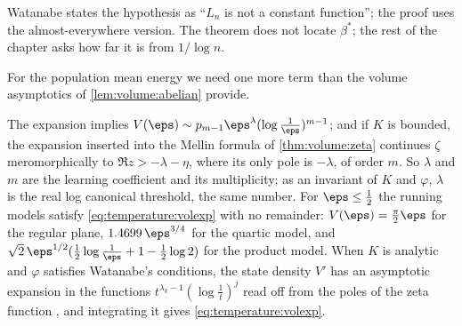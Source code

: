 \begin{refsection}
Watanabe states the hypothesis as ``$L_n$ is not a constant function''; the proof uses the almost-everywhere version. The theorem does not locate $\beta^*$; the rest of the chapter asks how far it is from $1/\log n$.

For the population mean energy we need one more term than the volume asymptotics of \cref{lem:volume:abelian} provide.


The expansion implies $V(\eps)\sim p_{m-1}\eps^\lambda(\log\frac1\eps)^{m-1}$; and if $K$ is bounded, the expansion inserted into the Mellin formula of \cref{thm:volume:zeta} continues $\zeta$ meromorphically to $\Re z>-\lambda-\eta$, where its only pole is $-\lambda$, of order $m$. So $\lambda$ and $m$ are the learning coefficient and its multiplicity; as an invariant of $K$ and $\varphi$, $\lambda$ is the real log canonical threshold, the same number. For $\eps\le\frac12$ the running models satisfy \eqref{eq:temperature:volexp} with no remainder: $V(\eps)=\frac\pi2\eps$ for the regular plane, $1.4699\,\eps^{3/4}$ for the quartic model, and $\sqrt2\,\eps^{1/2}(\frac12\log\frac1\eps+1-\frac12\log2)$ for the product model. When $K$ is analytic and $\varphi$ satisfies Watanabe's conditions, the state density $V'$ has an asymptotic expansion in the functions $t^{\lambda_k-1}(\log\frac1t)^j$ read off from the poles of the zeta function \parencite[Chapter~4]{Watanabe2009}, and integrating it gives \eqref{eq:temperature:volexp}.


\end{refsection}
